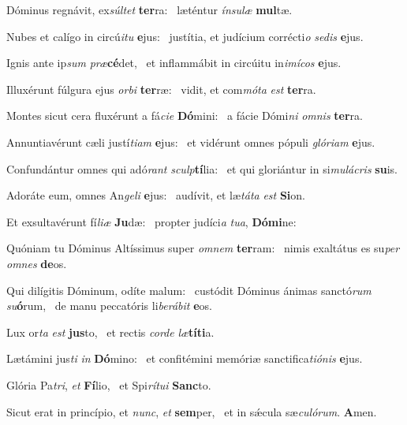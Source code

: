 \item Dóminus regnávit, ex\textit{súltet} \textbf{ter}ra:~\psstar{} læténtur \textit{ínsulæ} \textbf{mul}tæ.
\item Nubes et calígo in circú\textit{itu} \textbf{e}jus:~\psstar{} justítia, et judícium corrécti\textit{o} \textit{sedis} \textbf{e}jus.
\item Ignis ante ip\textit{sum} \textit{præ}\textbf{cé}det,~\psstar{} et inflammábit in circúitu in\textit{imícos} \textbf{e}jus.
\item Illuxérunt fúlgura ejus \textit{orbi} \textbf{ter}ræ:~\psstar{} vidit, et com\textit{móta} \textit{est} \textbf{ter}ra.
\item Montes sicut cera fluxérunt a fá\textit{cie} \textbf{Dó}mini:~\psstar{} a fácie Dómi\textit{ni} \textit{omnis} \textbf{ter}ra.
\item Annuntiavérunt cæli justí\textit{tiam} \textbf{e}jus:~\psstar{} et vidérunt omnes pópuli \textit{glóriam} \textbf{e}jus.
\item Confundántur omnes qui adó\textit{rant} \textit{sculp}\textbf{tí}lia:~\psstar{} et qui gloriántur in si\textit{mulácris} \textbf{su}is.
\item Adoráte eum, omnes An\textit{geli} \textbf{e}jus:~\psstar{} audívit, et læ\textit{táta} \textit{est} \textbf{Si}on.
\item Et exsultavérunt fí\textit{liæ} \textbf{Ju}dæ:~\psstar{} propter judíci\textit{a} \textit{tua}, \textbf{Dó}\textbf{mi}ne:
\item Quóniam tu Dóminus Altíssimus super \textit{omnem} \textbf{ter}ram:~\psstar{} nimis exaltátus es su\textit{per} \textit{omnes} \textbf{de}os.
\item Qui dilígitis Dóminum, odíte malum:~\pscross{} custódit Dóminus ánimas sanctó\textit{rum} \textit{su}\textbf{ó}rum,~\psstar{} de manu peccatóris li\textit{berábit} \textbf{e}os.
\item Lux or\textit{ta} \textit{est} \textbf{jus}to,~\psstar{} et rectis \textit{corde} \textit{læ}\textbf{tí}\textbf{ti}a.
\item Lætámini jus\textit{ti} \textit{in} \textbf{Dó}mino:~\psstar{} et confitémini memóriæ sanctifica\textit{tiónis} \textbf{e}jus.
\item Glória Pa\textit{tri}, \textit{et} \textbf{Fí}lio,~\psstar{} et Spi\textit{rítui} \textbf{Sanc}to.
\item Sicut erat in princípio, et \textit{nunc}, \textit{et} \textbf{sem}per,~\psstar{} et in sǽcula sæ\textit{culórum}. \textbf{A}men.
